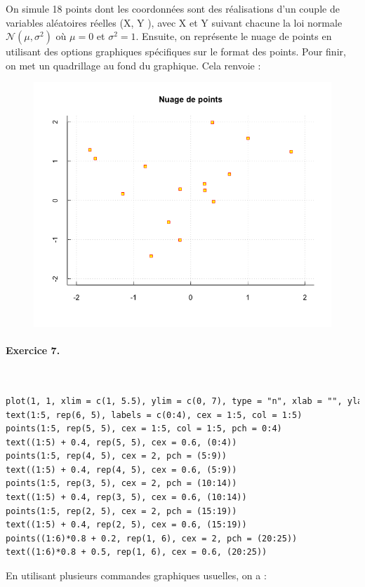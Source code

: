 On simule 18 points dont les coordonnées sont des réalisations d'un couple de variables aléatoires réelles (X, Y ), avec X et Y suivant chacune la loi normale $\mathcal{N}(\mu,\sigma^{2})$ où $\mu = 0$ et $\sigma^{2}=1$. \newline
Ensuite, on représente le nuage de points en utilisant des options graphiques spécifiques sur le format des points. \newline
Pour finir, on met un quadrillage au fond du graphique. Cela renvoie :
\begin{figure}[H]\begin{center}\includegraphics[scale=0.4]{ilu/gra95.png}\end{center}\end{figure}


\paragraph{Exercice 7. }\textcolor{white}{.}\newline
\begin{lstlisting}[language=html]
plot(1, 1, xlim = c(1, 5.5), ylim = c(0, 7), type = "n", xlab = "", ylab = "")
text(1:5, rep(6, 5), labels = c(0:4), cex = 1:5, col = 1:5)
points(1:5, rep(5, 5), cex = 1:5, col = 1:5, pch = 0:4)
text((1:5) + 0.4, rep(5, 5), cex = 0.6, (0:4))
points(1:5, rep(4, 5), cex = 2, pch = (5:9))
text((1:5) + 0.4, rep(4, 5), cex = 0.6, (5:9))
points(1:5, rep(3, 5), cex = 2, pch = (10:14))
text((1:5) + 0.4, rep(3, 5), cex = 0.6, (10:14))
points(1:5, rep(2, 5), cex = 2, pch = (15:19))
text((1:5) + 0.4, rep(2, 5), cex = 0.6, (15:19))
points((1:6)*0.8 + 0.2, rep(1, 6), cex = 2, pch = (20:25))
text((1:6)*0.8 + 0.5, rep(1, 6), cex = 0.6, (20:25))
\end{lstlisting}
En utilisant plusieurs commandes graphiques usuelles, on a : 

